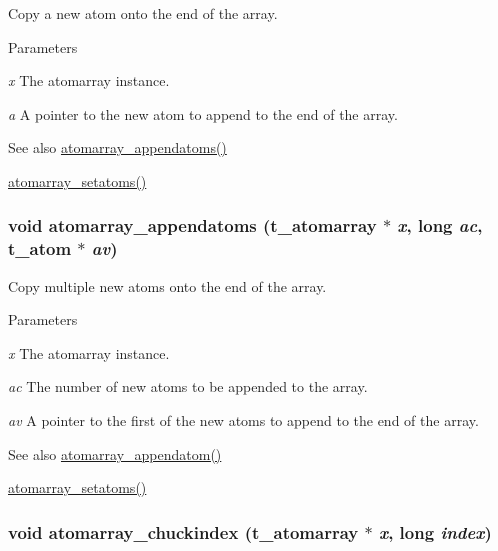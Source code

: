 Copy a new atom onto the end of the array. 
\begin{DoxyParams}{Parameters}
\item[{\em x}]The atomarray instance. \item[{\em a}]A pointer to the new atom to append to the end of the array.\end{DoxyParams}
\begin{DoxySeeAlso}{See also}
\hyperlink{group__atomarray_gae604fed9f8ca266b1b0d080e8cc929c3}{atomarray\_\-appendatoms()} 

\hyperlink{group__atomarray_ga52b68a97eb1bb7f97411715401d9d2ad}{atomarray\_\-setatoms()} 
\end{DoxySeeAlso}
\hypertarget{group__atomarray_gae604fed9f8ca266b1b0d080e8cc929c3}{
\subsubsection[{atomarray\_\-appendatoms}]{\setlength{\rightskip}{0pt plus 5cm}void atomarray\_\-appendatoms ({\bf t\_\-atomarray} $\ast$ {\em x}, \/  long {\em ac}, \/  {\bf t\_\-atom} $\ast$ {\em av})}}
\label{group__atomarray_gae604fed9f8ca266b1b0d080e8cc929c3}


Copy multiple new atoms onto the end of the array. 
\begin{DoxyParams}{Parameters}
\item[{\em x}]The atomarray instance. \item[{\em ac}]The number of new atoms to be appended to the array. \item[{\em av}]A pointer to the first of the new atoms to append to the end of the array.\end{DoxyParams}
\begin{DoxySeeAlso}{See also}
\hyperlink{group__atomarray_gad2d3608a3089f42590d744814c6fee42}{atomarray\_\-appendatom()} 

\hyperlink{group__atomarray_ga52b68a97eb1bb7f97411715401d9d2ad}{atomarray\_\-setatoms()} 
\end{DoxySeeAlso}
\hypertarget{group__atomarray_gaf76d3ab0de8a7b6b0b0e32193608c2dd}{
\subsubsection[{atomarray\_\-chuckindex}]{\setlength{\rightskip}{0pt plus 5cm}void atomarray\_\-chuckindex ({\bf t\_\-atomarray} $\ast$ {\em x}, \/  long {\em index})}}
\label{group__atomarray_gaf76d3ab0de8a7b6b0b0e32193608c2dd}


